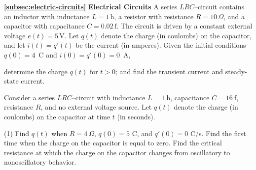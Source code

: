 \begin{Exercise}[title={Mixed Spring Mass and Electrical Network Systems}]
\setlength{\parindent}{-4ex}\textbf{\ref{subsec:electric-circuits}} \textbf{\large Electrical Circuits}
	\Question\label{3-6-5} A series $LRC$–circuit contains an inductor with inductance $L=1\,\text{h}$,
	a resistor with resistance $R=10\,\Omega$, and a capacitor with capacitance
	$C=0.02\,\text{f}$. The circuit is driven by a constant external voltage
	$e(t)=5\,\text{V}$. Let $q(t)$ denote the charge (in coulombs)
	on the capacitor, and let $i(t)=q'(t)$ be the current (in amperes).
	Given the initial conditions $q(0)=4$~C and $i(0)=q'(0)=0$~A, 
	\begin{tasks}
		\task 	determine the charge $q(t)$ for $t>0$; and
		\task find  the transient current and steady-state current.
	\end{tasks}
%	
%	
%	
%	
%	
%	
%	
	
 

	\Question\label{3-6-6} Consider a series $LRC$–circuit with inductance $L=1\ \text{h}$, capacitance 
	$C=16\ \text{f}$, resistance $R$, and no external voltage source.  
	Let $q(t)$ denote the charge (in coulombs) on the capacitor at time $t$ (in seconds).
	\begin{tasks}(1)
		\task Find $q(t)$ when $R=4\ \Omega$, $q(0)=5$ C, and $q'(0)=0$ C/s.
		\task Find the first time when the charge on the capacitor is equal to zero.
		\task Find the critical resistance at which the charge on the capacitor  changes from
		oscillatory to nonoscillatory behavior.
	\end{tasks}
	

\end{Exercise}
